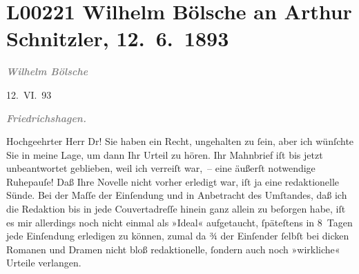 

\section[Wilhelm Bölsche an Arthur Schnitzler, 12. 6. 1893]{L00221 Wilhelm Bölsche an Arthur Schnitzler, 12. 6. 1893}
\nopagebreak{}
\rehead{ }\normalsize\beginnumbering{}
\toendnotes[C]{\smallbreak\pagebreak[2]}
\toendnotes[C]{\smallbreak}
\pstart
           
\pstart
           {\pb}\textcolor{gray}{\textbf{\textit{Wilhelm Bölsche}}}\pend
           
\pstart
           \raggedleft{}12. VI. 93\pend
           \pend
           
\pstart
           \textcolor{gray}{\textbf{\textit{Friedrichshagen.}}}\pend
           
\pstart{}Hochgeehrter Herr Dr!\pend\vspace{0.5em}
\pstart
           Sie haben ein Recht, ungehalten zu ſein, aber ich wünſchte Sie in meine Lage, um dann
               Ihr Urteil zu hören. Ihr Mahnbrief iſt bis jetzt unbeantwortet geblieben, weil ich
               verreiſt war, – eine äußerſt notwendige Ruhepauſe! Daß Ihre Novelle nicht vorher erledigt war, iſt ja eine redaktionelle
               Sünde. Bei der Maſſe der Einſendung und in Anbetracht des Umſtandes, daß ich die
               Redaktion bis in jede Couvertadreſſe hinein ganz allein zu beſorgen habe, iſt es mir
               allerdings noch nicht einmal als »Ideal« aufgetaucht, ſpäteſtens in 8 Tagen {\pb}jede Einſendung erledigen zu können, zumal da ¾ der
               Einſender ſelbſt bei dicken Romanen und Dramen nicht bloß redaktionelle, ſondern auch
               noch »wirkliche« Urteile verlangen.\pend
           
